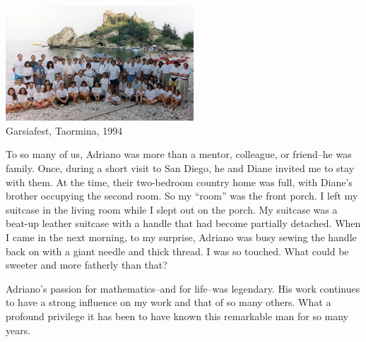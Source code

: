 \documentclass{notices}
\begin{document}
\begin{center}
 \includegraphics[height=1.7in]{Michelle_Wachs/EmbeddedImage.jpeg} 
 \\ {\footnotesize Garsiafest, Taormina, 1994}
\end{center}

To so many of us, Adriano was more than a mentor, colleague, or friend--he was family.  Once, during a short visit to San Diego, he and Diane invited me to stay with them. At the time, their two-bedroom country home  was full, with Diane’s brother occupying the second room.  So my ``room'' was the front porch.   I left my suitcase in the living room while I slept out on the porch.  My suitcase was a  beat-up leather suitcase with a handle that had become partially detached.  When I came in the next morning, to my surprise, Adriano  was busy sewing the handle back on with a giant needle and thick thread. I was so touched. What could be sweeter and more fatherly than that?  

Adriano’s passion for mathematics--and for life--was legendary.  His work continues to have a strong influence on my work and that of so many others.  What a profound privilege it has been to have known this remarkable man for so many years.
\end{document}
